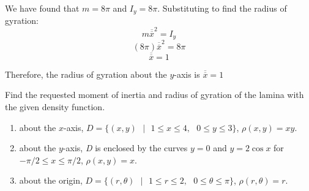 We have found that $m = 8\pi$ and $I_y = 8\pi$. Substituting to find the radius
of gyration:
$$m\overline{\overline{x}}^2 = I_y$$
$$(8\pi)\overline{\overline{x}}^2 = 8\pi$$
$$\overline{\overline{x}} = 1$$

Therefore, the radius of gyration about the $y$-axis is $\overline{\overline{x}
} = 1$

\begin{Exercise}[title = {Moments of Inertia and Radii of Gyration}, label = 
moment]
Find the requested moment of inertia and radius of gyration of the lamina with 
the given density function. 
\begin{enumerate}
\item about the $x$-axis, $\textit{D} = \{(x, y)\text{ }|\text{ } 1 \leq x \leq
4,\text{ } 0 \leq y \leq 3\}$, $\rho(x, y) = xy$.
\item about the $y$-axis, \textit{D} is enclosed by the curves $y = 0$ and $y =
2\cos{x}$ for $-\pi/2 \leq x \leq \pi/2$, $\rho(x, y) = x$.
\item about the origin, $\textit{D} = \{(r, \theta)\text{ }|\text{ }1 \leq r 
\leq 2, \text{ }0 \leq \theta \leq \pi\}$, $\rho(r, \theta) = r$. 
\end{enumerate}
\vspace{100mm}
\end{Exercise}

